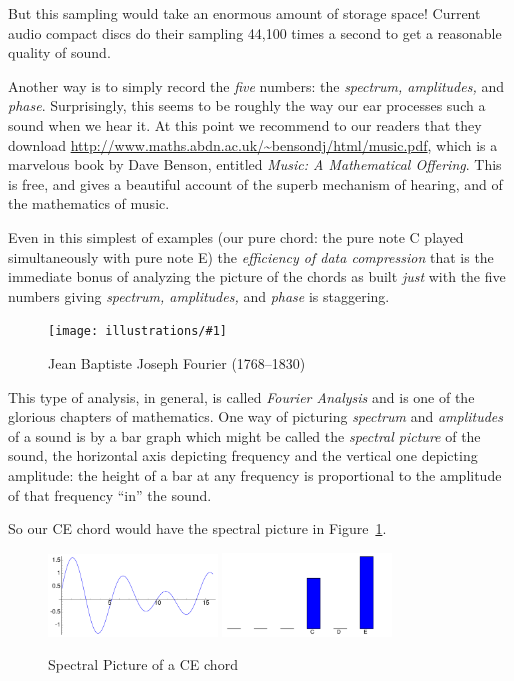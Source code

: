 \documentclass[11pt]{article}
\newcommand{\ill}[3]{ 
   \begin{figure}[H]
   \begin{center}
   \texttt{[image: illustrations/\#1]}
   \caption{#3}
   \end{center}
    \end{figure}
}
\theoremstyle{plain}
\theoremstyle{definition}
\numberwithin{equation}{section}
\numberwithin{figure}{section}
\numberwithin{table}{section}
\begin{document}
But this sampling would take an enormous amount of storage space!
Current audio compact discs do their sampling 44,100 times a second to
get a reasonable quality of sound.

Another way is to simply record the {\em five} numbers: the {\em
  spectrum, amplitudes,} and {\em phase}.  Surprisingly, this seems to
be roughly the way our ear processes such a sound when we hear it.  At
this point we recommend to our readers that they download
\url{http://www.maths.abdn.ac.uk/~bensondj/html/music.pdf}, which is a
marvelous book by Dave Benson, entitled {\em Music: A Mathematical
  Offering}. This is free, and gives a beautiful account of the superb
mechanism of hearing, and of the mathematics of music.

  Even in this simplest of examples (our pure chord: the pure note C
  played simultaneously with pure note E) the {\em efficiency of data
    compression} that is the immediate bonus of analyzing the picture
  of the chords as built {\em just} with the five numbers giving {\em
    spectrum, amplitudes,} and {\em phase} is staggering.

\ill{fourier}{0.3}{Jean Baptiste Joseph Fourier (1768--1830)}

This type of analysis, in general, is called {\em Fourier Analysis}
and is one of the glorious chapters of mathematics.  One way of
picturing {\em spectrum} and {\em amplitudes} of a sound is by a bar
graph which might be called the {\em spectral picture} of the sound,
the horizontal axis depicting frequency and the vertical one depicting
amplitude: the height of a bar at any frequency is proportional to the
amplitude of that frequency ``in'' the sound.
 
So our CE chord would have the spectral picture in
Figure~\ref{fig:ce-spectral}.
 
\begin{figure}[H]
\begin{center}
\includegraphics[width=0.4\textwidth]{illustrations/sound-ce-general_sum}
\includegraphics[width=0.4\textwidth]{illustrations/sound-ce-general_sum-blips}
\end{center}
\caption{Spectral Picture of a CE chord\label{fig:ce-spectral}}
\end{figure}
\end{document}
